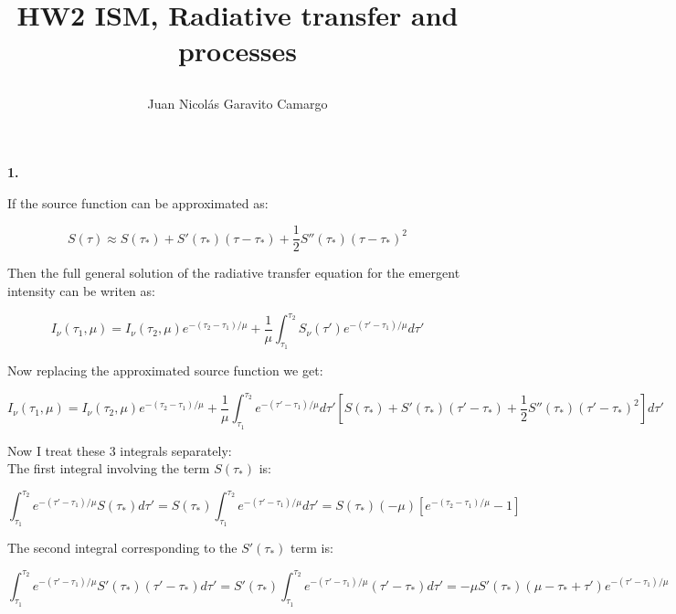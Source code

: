 \documentclass[12pt]{article}
\title{\begin{LARGE}
{HW2 ISM, Radiative transfer and processes}
\end{LARGE}}
\author{Juan Nicol\'as Garavito Camargo}
\begin{document}
\maketitle


\begin{LARGE}
\textbf{1.}
\end{LARGE}

If the source function can be approximated as: 

\begin{equation}\label{approx}
S(\tau) \approx S(\tau_{*}) + S'(\tau_*)(\tau - \tau_*) + \dfrac{1}{2}S''(\tau_*)(\tau-\tau_*)^2	
\end{equation}

Then the full general solution of the radiative transfer equation 
for the emergent intensity can be writen as:

\begin{equation}\label{sol}
I_{\nu}(\tau_1, \mu) = I_{\nu}(\tau_2, \mu) e^{-(\tau_2 - \tau_1)/\mu} + \dfrac{1}{\mu}\int_{\tau_1}^{\tau_2}S_{\nu}(\tau ')e^{-(\tau ' - \tau_1)/\mu} d\tau '
\end{equation}

Now replacing the approximated source function we get:


\begin{equation}
I_{\nu}(\tau_1, \mu) = I_{\nu}(\tau_2, \mu) e^{-(\tau_2 - \tau_1)/\mu} + 
\dfrac{1}{\mu} \int_{\tau_1}^{\tau_2} e^{-(\tau ' - \tau_1)/\mu} d\tau ' 
\left[  S(\tau_{*}) + S'(\tau_*)(\tau ' - \tau_*) + \dfrac{1}{2}S''(\tau_*)(\tau '-\tau_*)^2 \right] d\tau '
\end{equation}

Now I treat these 3 integrals separately:\\

The first integral involving the term $S(\tau_*)$ is:

\begin{equation}\label{int1}
\int_{\tau_1}^{\tau_2}e^{-(\tau ' - \tau_1)/\mu} S(\tau_*) d\tau ' =
S(\tau_*)\int_{\tau_1}^{\tau_2}e^{-(\tau' - \tau_1)/\mu} d\tau ' = S(\tau_*) (-\mu) \left[ e^{-(\tau_2 - \tau_1)/\mu} - 1 \right]
\end{equation}

The second integral corresponding to the $S'(\tau_*)$ term is:

\begin{equation*}
\int_{\tau_1}^{\tau_2}e^{-(\tau ' - \tau_1)/\mu} S'(\tau_*)(\tau ' - \tau_*) d\tau ' = S'(\tau_*) \int_{\tau_1}^{\tau_2}e^{-(\tau ' - \tau_1)/\mu} (\tau ' - \tau_*)
d\tau ' = -\mu S'(\tau_*)(\mu - \tau_* + \tau')e^{-(\tau ' - \tau_1)/\mu}
\end{equation*}
\end{document}
